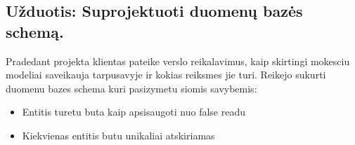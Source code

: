 \documentclass{VUMIFPSkursinis}
\begin{document}
		
	
		
	\subsection{Užduotis: Suprojektuoti duomenų bazės schemą.}
		Pradedant projekta klientas pateike verslo reikalavimus, kaip skirtingi mokesciu modeliai saveikauja tarpusavyje ir kokias reiksmes jie turi.
		Reikejo sukurti duomenu bazes schema kuri pasizymetu siomis savybemis:
		\begin{itemize}
			\item{Entitis turetu buta kaip apsisaugoti nuo false readu}
			\item{Kiekvienas entitis butu unikaliai atskiriamas}
		\end{itemize}
		
\end{document}
